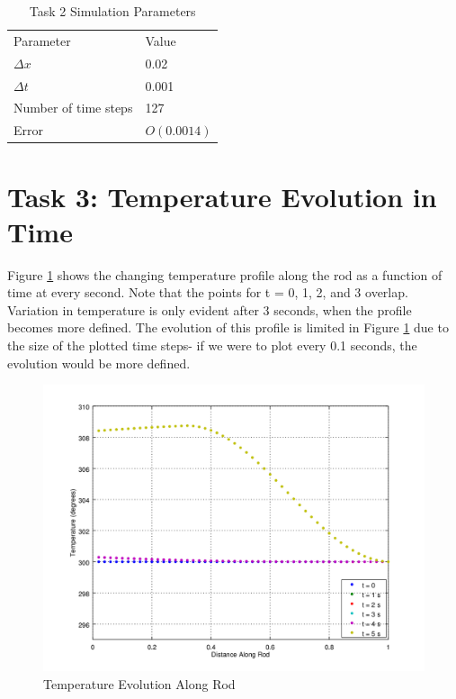 \documentclass[12pt]{amsart}
\begin{document}
\begin{table}[]
\centering
\caption{Task 2 Simulation Parameters}
\label{task2param}
\begin{tabular}{ll}
Parameter            & Value \\
$\Delta x$           & 0.02  \\
$\Delta t$           & 0.001 \\
Number of time steps & 127 \\
Error & $ O(0.0014)$
\end{tabular}
\end{table}

\section{Task 3: Temperature Evolution in Time} \label{tempevolutionsection}
Figure \ref{fig:task3fig} shows the changing temperature profile along the rod as a function of time at every second. Note that the points for t = 0, 1, 2, and 3 overlap. Variation in temperature is only evident after 3 seconds, when the profile becomes more defined. The evolution of this profile is limited in Figure \ref{fig:task3fig} due to the size of the plotted time steps- if we were to plot every 0.1 seconds, the evolution would be more defined. 
\begin{center}
\begin{figure}
\includegraphics[scale=0.7]{task3fig}
\caption{Temperature Evolution Along Rod}
\label{fig:task3fig}
\end{figure}
\end{center}
\end{document}
